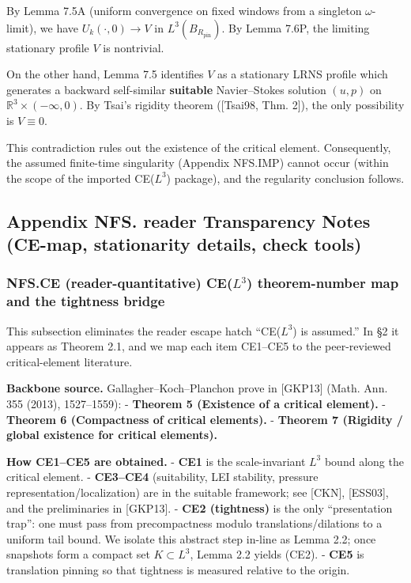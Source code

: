 \documentclass[
  11pt,
]{article}
\begin{document}
By Lemma 7.5A (uniform convergence on fixed windows from a singleton \(\omega\)-limit), we have \(U_k(\cdot,0)\to V\) in \(L^3(B_{R_{\mathrm{pin}}})\). By Lemma 7.6P, the limiting stationary profile \(V\) is nontrivial.

On the other hand, Lemma 7.5 identifies \(V\) as a stationary LRNS profile which generates a backward self-similar \textbf{suitable} Navier--Stokes solution \((u,p)\) on \(\mathbb R^3\times(-\infty,0)\). By Tsai's rigidity theorem ({[}Tsai98, Thm. 2{]}), the only possibility is \(V\equiv 0\).

This contradiction rules out the existence of the critical element. Consequently, the assumed finite-time singularity (Appendix NFS.IMP) cannot occur (within the scope of the imported CE(\(L^3\)) package), and the regularity conclusion follows.

\hypertarget{appendix-nfs.-reader-transparency-notes-ce-map-stationarity-details-check-tools}{%
\subsection{Appendix NFS. reader Transparency Notes (CE-map, stationarity details, check tools)}\label{appendix-nfs.-reader-transparency-notes-ce-map-stationarity-details-check-tools}}

\hypertarget{nfs.ce-reader-quantitative-cel3-theorem-number-map-and-the-tightness-bridge}{%
\subsubsection{\texorpdfstring{NFS.CE (reader-quantitative) CE(\(L^3\)) theorem-number map and the tightness bridge}{NFS.CE (reader-quantitative) CE(L\^{}3) theorem-number map and the tightness bridge}}\label{nfs.ce-reader-quantitative-cel3-theorem-number-map-and-the-tightness-bridge}}

This subsection eliminates the reader escape hatch ``CE(\(L^3\)) is assumed.'' In §2 it appears as Theorem 2.1, and we map each item CE1--CE5 to the peer-reviewed critical-element literature.

\textbf{Backbone source.} Gallagher--Koch--Planchon prove in {[}GKP13{]} (Math. Ann. 355 (2013), 1527--1559): - \textbf{Theorem 5 (Existence of a critical element).} - \textbf{Theorem 6 (Compactness of critical elements).} - \textbf{Theorem 7 (Rigidity / global existence for critical elements).}

\textbf{How CE1--CE5 are obtained.} - \textbf{CE1} is the scale-invariant \(L^3\) bound along the critical element. - \textbf{CE3--CE4} (suitability, LEI stability, pressure representation/localization) are in the suitable framework; see {[}CKN{]}, {[}ESS03{]}, and the preliminaries in {[}GKP13{]}. - \textbf{CE2 (tightness)} is the only ``presentation trap'': one must pass from precompactness modulo translations/dilations to a uniform tail bound. We isolate this abstract step in-line as Lemma 2.2; once snapshots form a compact set \(K\subset L^3\), Lemma 2.2 yields (CE2). - \textbf{CE5} is translation pinning so that tightness is measured relative to the origin.
\end{document}
